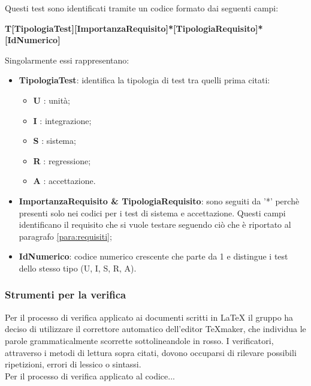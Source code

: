 Questi test sono identificati tramite un codice formato dai seguenti campi:
\begin{center}
\textbf{T[TipologiaTest][ImportanzaRequisito]*[TipologiaRequisito]*[IdNumerico]} 
\end{center}
Singolarmente essi rappresentano:
\begin{itemize}
	\item \textbf{TipologiaTest}: identifica la tipologia di test tra quelli prima citati:
		\begin{itemize}
			\item \textbf{U} : unità;
			\item \textbf{I} : integrazione;
			\item \textbf{S} : sistema;
			\item \textbf{R} : regressione;
			\item \textbf{A} : accettazione.			 
		\end{itemize}
	\item \textbf{ImportanzaRequisito \& TipologiaRequisito}: sono seguiti da '*' perchè presenti solo nei codici per i test di sistema e accettazione. Questi campi identificano il requisito che si vuole testare seguendo ciò che è riportato al paragrafo \ref{para:requisiti};
	\item \textbf{IdNumerico}: codice numerico crescente che parte da 1 e distingue i test dello stesso tipo (U, I, S, R, A).
\end{itemize}
 
\subsubsection{Strumenti per la verifica}
Per il processo di verifica applicato ai documenti scritti in \LaTeX{} il gruppo ha deciso di utilizzare il correttore automatico dell'editor TeXmaker, che individua le parole grammaticalmente scorrette sottolineandole in rosso. I verificatori, attraverso i metodi di lettura sopra citati, dovono occuparsi di rilevare possibili ripetizioni, errori di lessico o sintassi.  \\
\linebreak
Per il processo di verifica applicato al codice...

















